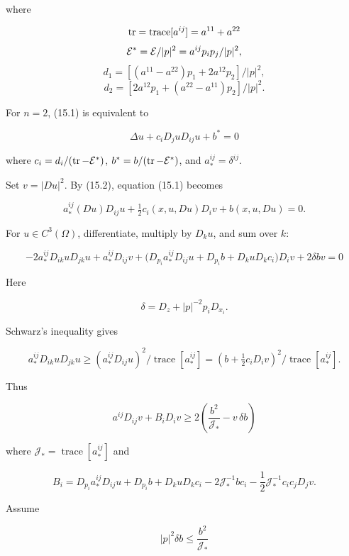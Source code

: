 where

\[
\operatorname{tr}=\operatorname{trace}[a^{ij}]=a^{11}+a^{22}
\]
\[
\mathcal{E}^{*}=\mathcal{E}/|p|^2=a^{ij}p_ip_j/|p|^2,
\]
\[
d_1=[(a^{11}-a^{22})p_1+2a^{12}p_2]/|p|^2,
\]
\[
d_2=[2a^{12}p_1+(a^{22}-a^{11})p_2]/|p|^2.
\]

For \(n=2\), (15.1) is equivalent to

\begin{equation}
\Delta u+c_iD_j uD_{ij}u+b^*=0
\tag{15.6}
\end{equation}

where \(c_i=d_i/(\operatorname{tr}-\mathcal{E}^{*})\), \(b^*=b/(\operatorname{tr}-\mathcal{E}^{*})\), and
\(a_*^{ij}=\delta^{ij}\).

Set \(v=|Du|^2\). By (15.2), equation (15.1) becomes

\[
a_*^{ij}(Du)D_{ij}u+\tfrac12 c_i(x,u,Du)D_iv+b(x,u,Du)=0.
\]




For \(u\in C^3(\Omega)\), differentiate, multiply by \(D_ku\), and sum over \(k\):

\begin{equation}
\tag{15.7}
-2a_*^{ij}D_{ik}uD_{jk}u+a_*^{ij}D_{ij}v+\bigl(D_{p_i}a_*^{ij}D_{ij}u+D_{p_i}b+D_kuD_kc_i\bigr)D_iv+2\delta bv=0
\end{equation}

Here

\begin{equation}
\tag{15.8}
\delta=D_z+|p|^{-2}p_iD_{x_i}.
\end{equation}

Schwarz's inequality gives

\begin{equation}
\tag{15.9}
a_*^{ij}D_{ik}uD_{jk}u\ge (a_*^{ij}D_{ij}u)^2/\operatorname{trace}[a_*^{ij}]
=(b+\tfrac12c_iD_iv)^2/\operatorname{trace}[a_*^{ij}].
\end{equation}

Thus

\begin{equation}
\tag{15.10}
a^{ij}D_{ij}v+B_iD_iv\ge 2\left(\frac{b^2}{\mathcal{J}_*}-v\,\delta b\right)
\end{equation}

where $\mathcal{J}_*=\operatorname{trace}[a_*^{ij}]$ and

\[
B_i=D_{p_i}a_*^{ij}D_{ij}u+D_{p_i}b+D_kuD_kc_i-2\mathcal{J}_*^{-1}bc_i-\frac12\mathcal{J}_*^{-1}c_ic_jD_jv.
\]

Assume

\begin{equation}
\tag{15.11}
|p|^2\delta b\le \frac{b^2}{\mathcal{J}_*}
\end{equation}

